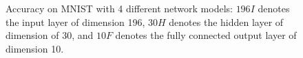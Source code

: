 \documentclass[3p,times,procedia]{elsarticle}
\begin{document}
\begin{figure}[h]
	\centering
	\hspace{-5mm}
	\hspace{-5mm}

	\caption{
		Accuracy on 
		MNIST with 4 different network
		models: 
		$196I$ denotes
		the input layer of dimension 196, 
		$30H$ denotes the hidden layer
		of dimension of 30, and $10F$ 
		denotes
		the fully connected output layer 
		of dimension 10.
		}
	\label{fig:4}
\end{figure}
\end{document}
